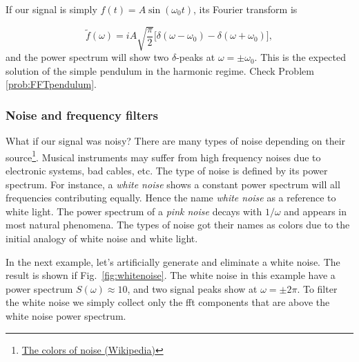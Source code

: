 If our signal is simply $f(t) = A \sin(\omega_0 t)$, its Fourier transform is 

\begin{equation}
\tilde{f}(\omega) = i A \sqrt{\dfrac{\pi}{2}}\Big[\delta(\omega-\omega_0)-\delta(\omega+\omega_0)\Big],
\end{equation}
and the power spectrum will show two $\delta$-peaks at $\omega = \pm \omega_0$. This is the expected solution of the simple pendulum in the harmonic regime. Check Problem \ref{prob:FFTpendulum}.

\subsubsection{Noise and frequency filters}

What if our signal was noisy? There are many types of noise depending on their source\footnote{\href{https://en.wikipedia.org/wiki/Colors\_of\_noise}{The colors of noise (Wikipedia)}}. Musical instruments may suffer from high frequency noises due to electronic systems, bad cables, etc. The type of noise is defined by its power spectrum. For instance, a \textit{white noise} shows a constant power spectrum will all frequencies contributing equally. Hence the name \textit{white noise} as a reference to white light. The power spectrum of a \textit{pink noise} decays with $1/\omega$ and appears in most natural phenomena. The types of noise got their names as colors due to the initial analogy of white noise and white light.

In the next example, let's artificially generate and eliminate a white noise. The result is shown if Fig.~\ref{fig:whitenoise}. The white noise in this example have a power spectrum $S(\omega) \approx 10$, and two signal peaks show at $\omega = \pm 2\pi$. To filter the white noise we simply collect only the fft components that are above the white noise power spectrum.

